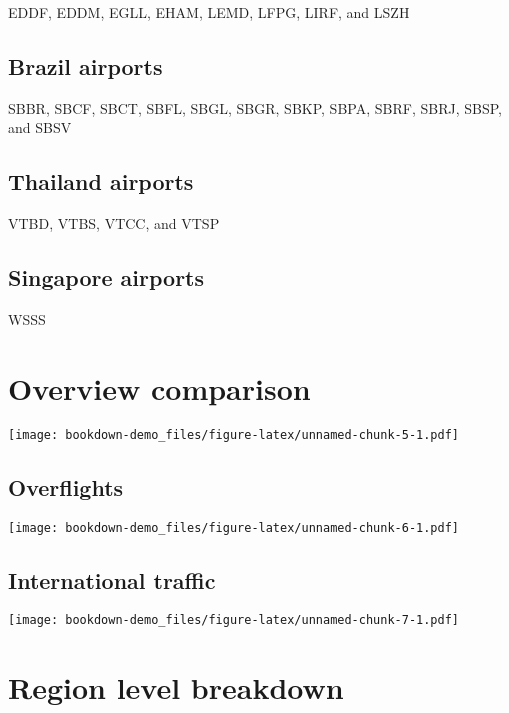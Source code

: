 \documentclass[
]{book}
\begin{document}
EDDF, EDDM, EGLL, EHAM, LEMD, LFPG, LIRF, and LSZH

\hypertarget{brazil-airports}{%
\section{Brazil airports}\label{brazil-airports}}

SBBR, SBCF, SBCT, SBFL, SBGL, SBGR, SBKP, SBPA, SBRF, SBRJ, SBSP, and SBSV

\hypertarget{thailand-airports}{%
\section{Thailand airports}\label{thailand-airports}}

VTBD, VTBS, VTCC, and VTSP

\hypertarget{singapore-airports}{%
\section{Singapore airports}\label{singapore-airports}}

WSSS

\hypertarget{overview-comparison}{%
\chapter{Overview comparison}\label{overview-comparison}}

\texttt{[image: bookdown-demo\_files/figure-latex/unnamed-chunk-5-1.pdf]}

\hypertarget{overflights}{%
\section{Overflights}\label{overflights}}

\texttt{[image: bookdown-demo\_files/figure-latex/unnamed-chunk-6-1.pdf]}

\hypertarget{international-traffic}{%
\section{International traffic}\label{international-traffic}}

\texttt{[image: bookdown-demo\_files/figure-latex/unnamed-chunk-7-1.pdf]}

\hypertarget{region-level-breakdown}{%
\chapter{Region level breakdown}\label{region-level-breakdown}}
\end{document}
